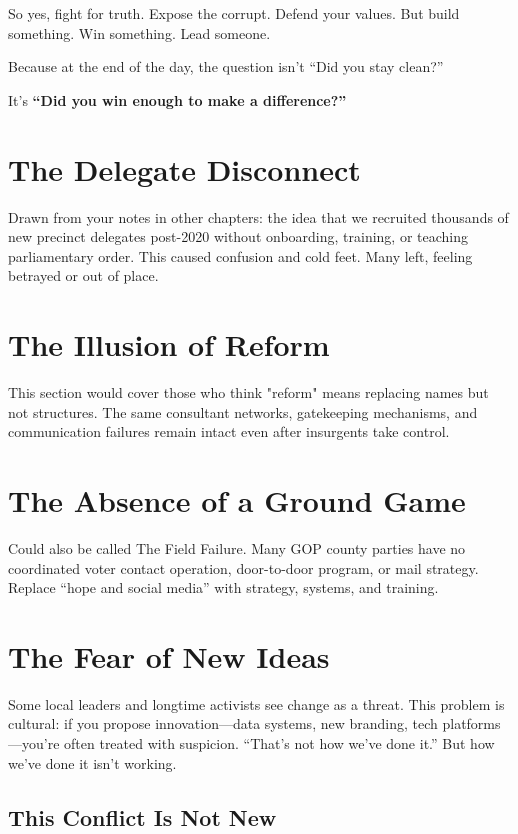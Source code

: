 So yes, fight for truth. Expose the corrupt. Defend your values. But build something. Win something. Lead someone.

Because at the end of the day, the question isn’t ``Did you stay clean?''

It’s \textbf{``Did you win enough to make a difference?''}




















\section{The Delegate Disconnect}
Drawn from your notes in other chapters: the idea that we recruited thousands of new precinct delegates post-2020 without onboarding, training, or teaching parliamentary order. This caused confusion and cold feet. Many left, feeling betrayed or out of place.
\section{The Illusion of Reform}
This section would cover those who think "reform" means replacing names but not structures. The same consultant networks, gatekeeping mechanisms, and communication failures remain intact even after insurgents take control.
\section{The Absence of a Ground Game}
Could also be called The Field Failure. Many GOP county parties have no coordinated voter contact operation, door-to-door program, or mail strategy. Replace “hope and social media” with strategy, systems, and training.
\section{The Fear of New Ideas}
Some local leaders and longtime activists see change as a threat. This problem is cultural: if you propose innovation—data systems, new branding, tech platforms—you’re often treated with suspicion. “That’s not how we’ve done it.” But how we’ve done it isn’t working.



\subsection{This Conflict Is Not New}

